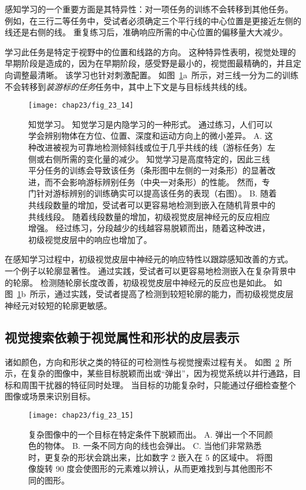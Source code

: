 感知学习的一个重要方面是其特异性：对一项任务的训练不会转移到其他任务。
例如，在三行二等任务中，受试者必须确定三个平行线的中心位置是更接近左侧的线还是右侧的线。
重复练习后，准确响应所需的中心位置的偏移量大大减少。


学习此任务是特定于视野中的位置和线路的方向。
这种特异性表明，视觉处理的早期阶段是造成的，因为在早期阶段，感受野是最小的，视觉图最精确的，并且定向调整最清晰。
该学习也针对刺激配置。
如图~\ref{fig:23_14}a~所示，对三线一分为二的训练不会转移到\textit{装游标的任务}任务中，其中上下文是与目标线共线的线。


\begin{figure}[htbp]
	\centering
	\texttt{[image: chap23/fig\_23\_14]}
	\caption{知觉学习。
		知觉学习是内隐学习的一种形式。
		通过练习，人们可以学会辨别物体在方位、位置、深度和运动方向上的微小差异。
		A. 这种改进被视为可靠地检测倾斜线或位于几乎共线的线（游标任务）左侧或右侧所需的变化量的减少。
		知觉学习是高度特定的，因此三线平分任务的训练会导致该任务（条形图中左侧的一对条形）的显著改进，而不会影响游标辨别任务（中央一对条形）的性能。
		然而，专门针对游标辨别的训练确实可以提高该任务的表现（右图）。
		B. 随着共线段数量的增加，受试者可以更容易地检测到嵌入在随机背景中的共线线段。
		随着线段数量的增加，初级视觉皮层神经元的反应相应增强。
		经过练习，分段越少的线越容易脱颖而出，随着这种改进，初级视觉皮层中的响应也增加了\cite{crist2001learning,li2008learning}。}
	\label{fig:23_14}
\end{figure}


在感知学习过程中，初级视觉皮层中神经元的响应特性以跟踪感知改善的方式。
一个例子以轮廓显著性。
通过实践，受试者可以更容易地检测嵌入在复杂背景中的轮廓。
检测随轮廓长度改善，初级视觉皮层中神经元的反应也是如此。
如图~\ref{fig:23_14}b~所示，通过实践，受试者提高了检测到较短轮廓的能力，而初级视觉皮层神经元对较短的轮廓更敏感。



\subsection{视觉搜索依赖于视觉属性和形状的皮层表示}

诸如颜色，方向和形状之类的特征的可检测性与视觉搜索过程有关。
如图~\ref{fig:23_15}~所示，在复杂的图像中，某些目标脱颖而出或“弹出”，因为视觉系统以并行通路，目标和周围干扰器的特征同时处理。
当目标的功能复杂时，只能通过仔细检查整个图像或场景来识别目标。


\begin{figure}[htbp]
	\centering
	\texttt{[image: chap23/fig\_23\_15]}
	\caption{复杂图像中的一个目标在特定条件下脱颖而出。
		A. 弹出一个不同颜色的物体。
		B. 一条不同方向的线也会弹出。
		C. 当他们非常熟悉时，更复杂的形状会跳出来，比如数字 2 嵌入在 5 的区域中。
		将图像旋转 90 度会使图形的元素难以辨认，从而更难找到与其他图形不同的图形\cite{wang1994familiarity}。}
	\label{fig:23_15}
\end{figure}


